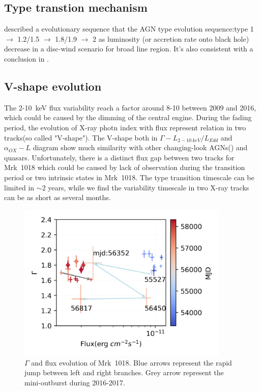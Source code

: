 \documentclass{aastex63}
\begin{document}
\subsection{Type transtion mechanism}
\citet{2014MNRAS.438.3340E} described a evolutionary sequence that the AGN type evolution sequence:type 1 $\to$ 1.2/1.5 $\to$ 1.8/1.9 $\to$ 2 as luminosity (or accretion rate onto black hole) decrease in a disc-wind scenario for broad line region. It's also consistent with a conclusion in \citet{2018MNRAS.480.3898N}.  


\subsection{V-shape evolution}
The 2-10~keV flux variability reach a factor around 8-10 between 2009 and 2016, which could be caused by the dimming of the central engine. During the fading period, the evolution of X-ray photn index with flux represent relation in two tracks(so called "V-shape").  
The V-shape both in $\Gamma-L_{2-10~keV}/L_{Edd}$ and $\alpha_{OX}-L$ diagram show much similarity with other changing-look AGNs(\citep[see ][]{2019arXiv190904676R}) and quasars\citep[see ][]{2019ApJ...883...76R}.
Unfortunately, there is a distinct flux gap between two tracks for Mrk~1018 which could be caused by lack of observation during the transition period or two intrinsic states in Mrk~1018. The type transition timescale can be limited in $\sim 2$ years, while we find the variability timescale in two X-ray tracks can be as short as several months. 
 

\begin{figure}
\centering
	\includegraphics[width=0.9\textwidth]{./pic/xrayappendgood-errorbar-f-g-tmap.png}
    \caption{$\Gamma$ and flux evolution of Mrk~1018. Blue arrows represent the rapid jump between left and right branches. Grey arrow represent the mini-outburst during 2016-2017.}
    \label{fig:xrayappendgood-fandg-tmap}
\end{figure}
\end{document}
